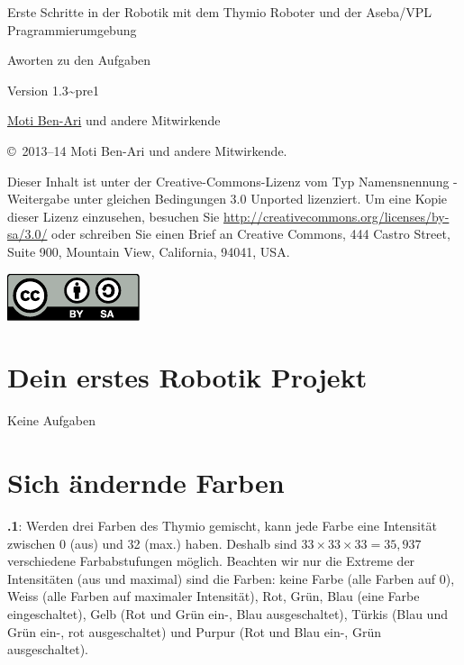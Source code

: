 \documentclass[12pt,a4paper,english]{article}
\begin{document}
\thispagestyle{empty}

\begin{center}
\begin{bfseries}

\begin{Large}
Erste Schritte in der Robotik mit dem Thymio Roboter
und der Aseba/VPL Pragrammierumgebung
\bigskip

Aworten zu den Aufgaben 
\end{Large}

Version 1.3{\textasciitilde}pre1

\bigskip

\href{http://www.weizmann.ac.il/sci-tea/benari/}{Moti Ben-Ari} und andere Mitwirkende

\end{bfseries}
\end{center}

\bigskip

\copyright{}\  2013--14 Moti Ben-Ari und andere Mitwirkende.

Dieser Inhalt ist unter der Creative-Commons-Lizenz vom Typ Namensnennung -
Weitergabe unter gleichen Bedingungen 3.0 Unported lizenziert.
Um eine Kopie dieser Lizenz einzusehen, besuchen Sie \url{http://creativecommons.org/licenses/by-sa/3.0/} oder schreiben Sie einen Brief an Creative Commons, 444 Castro Street, Suite 900, Mountain View, California, 94041, USA.

\begin{center}
\hspace{6pt}\includegraphics[width=.2\textwidth]{../images/by-sa}
\end{center}

\section{Dein erstes Robotik Projekt}

Keine Aufgaben

\section{Sich ändernde Farben}

\textbf{\thesection.1}: 
Werden drei Farben des Thymio gemischt, kann jede Farbe eine Intensität zwischen 0 (aus) und 32 (max.) haben. Deshalb sind $33 \times 33 \times 33=35,937$ verschiedene Farbabstufungen möglich. Beachten wir nur die Extreme der Intensitäten (aus und maximal) sind die Farben: keine Farbe (alle Farben auf 0), Weiss (alle Farben auf maximaler Intensität), Rot, Grün, Blau (eine Farbe eingeschaltet), Gelb (Rot und Grün ein-, Blau ausgeschaltet), Türkis (Blau und Grün ein-, rot ausgeschaltet) und Purpur (Rot und Blau ein-, Grün ausgeschaltet).
\end{document}
